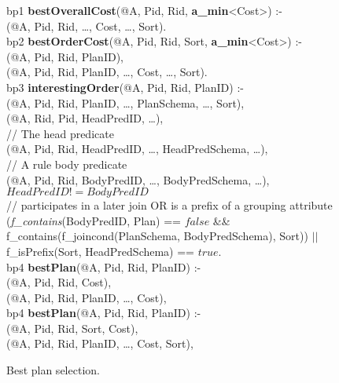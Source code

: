 \begin{figure*}
\ssp
\centering
\begin{boxedminipage}{\linewidth}
bp1 {\bf bestOverallCost}(@A, Pid, Rid, {\small \bf a\_min}<Cost>) :- \\
(@A, Pid, Rid, \ldots, Cost, \ldots, Sort). \\

bp2 {\bf bestOrderCost}(@A, Pid, Rid, Sort, {\small \bf a\_min}<Cost>) :- \\
(@A, Pid, Rid, PlanID), \\
(@A, Pid, Rid, PlanID, \ldots, Cost, \ldots, Sort). \\

bp3 {\bf interestingOrder}(@A, Pid, Rid, PlanID) :- \\
(@A, Pid, Rid, PlanID, \ldots, PlanSchema, \ldots, Sort), \\
(@A, Rid, Pid, HeadPredID, \ldots), \\
\datalogspace // The head predicate \\
(@A, Pid, Rid, HeadPredID, \ldots, HeadPredSchema, \ldots),\\
\datalogspace // A rule body predicate \\
(@A, Pid, Rid, BodyPredID, \ldots, BodyPredSchema, \ldots),\\
\datalogspace $HeadPredID != BodyPredID$ \\
\datalogspace // participates in a later join OR is a prefix of a grouping attribute \\ 
\datalogspace ({\em f\_contains}(BodyPredID, Plan) ==  $false$ \&\& \\
\datalogspace f\_contains(f\_joincond(PlanSchema, BodyPredSchema), Sort)) $||$ \\
\datalogspace f\_isPrefix(Sort, HeadPredSchema) ==  $true$.  \\

bp4 {\bf bestPlan}(@A, Pid, Rid, PlanID) :- \\
(@A, Pid, Rid, Cost), \\
(@A, Pid, Rid, PlanID, \ldots, Cost), \\

bp4 {\bf bestPlan}(@A, Pid, Rid, PlanID) :- \\
(@A, Pid, Rid, Sort, Cost), \\
(@A, Pid, Rid, PlanID, \ldots, Cost, Sort), \\
\end{boxedminipage}
\caption{\label{ch:opt:fig:bestplan}Best plan selection.}
\end{figure*}

